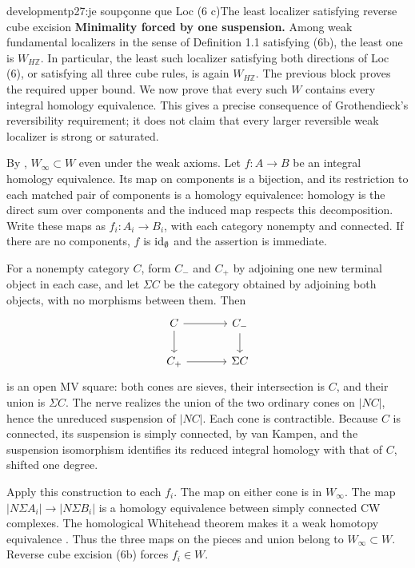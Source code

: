 \begin{dcomment}{development}{p27:je soupçonne que Loc (6 c)}{The least localizer satisfying reverse cube excision}
\textbf{Minimality forced by one suspension.}\ours
Among weak fundamental localizers in the sense of Definition 1.1 satisfying (6b), the least one is $W_{H\mathbb Z}$. In particular, the least such localizer satisfying both directions of Loc (6), or satisfying all three cube rules, is again $W_{H\mathbb Z}$. The previous block proves the required upper bound. We now prove that every such $W$ contains every integral homology equivalence. This gives a precise consequence of Grothendieck's reversibility requirement; it does not claim that every larger reversible weak localizer is strong or saturated.

By \citet[Theorem 6.1.18]{Cisinski2006}, $W_\infty\subset W$ even under the weak axioms. Let $f:A\to B$ be an integral homology equivalence. Its map on components is a bijection, and its restriction to each matched pair of components is a homology equivalence: homology is the direct sum over components and the induced map respects this decomposition. Write these maps as $f_i:A_i\to B_i$, with each category nonempty and connected. If there are no components, $f$ is $\mathrm{id}_\emptyset$ and the assertion is immediate.

For a nonempty category $C$, form $C_-$ and $C_+$ by adjoining one new terminal object in each case, and let $\Sigma C$ be the category obtained by adjoining both objects, with no morphisms between them. Then
\[
\begin{tikzcd}[column sep=large]
C\arrow[r]\arrow[d] & C_-\arrow[d]\\
C_+\arrow[r] & \Sigma C
\end{tikzcd}
\]
is an open MV square: both cones are sieves, their intersection is $C$, and their union is $\Sigma C$. The nerve realizes the union of the two ordinary cones on $|NC|$, hence the unreduced suspension of $|NC|$. Each cone is contractible. Because $C$ is connected, its suspension is simply connected, by van Kampen, and the suspension isomorphism identifies its reduced integral homology with that of $C$, shifted one degree.

Apply this construction to each $f_i$. The map on either cone is in $W_\infty$. The map $|N\Sigma A_i|\to|N\Sigma B_i|$ is a homology equivalence between simply connected CW complexes. The homological Whitehead theorem makes it a weak homotopy equivalence \citep[Corollary 4.33, pp.~367--368]{Hatcher2002}. Thus the three maps on the pieces and union belong to $W_\infty\subset W$. Reverse cube excision (6b) forces $f_i\in W$.


\end{dcomment}
